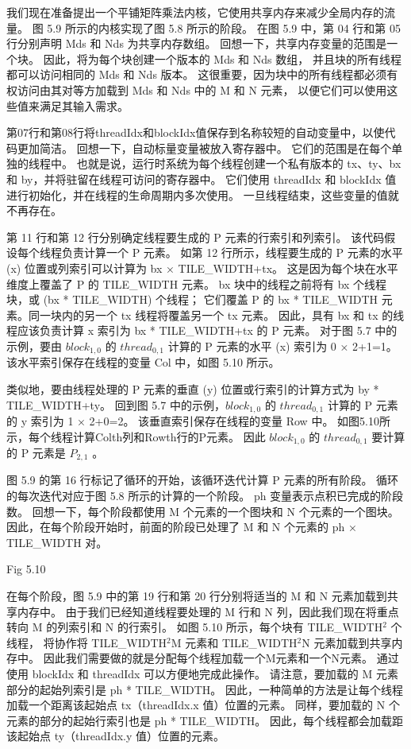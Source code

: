 我们现在准备提出一个平铺矩阵乘法内核，它使用共享内存来减少全局内存的流量。 
图 5.9 所示的内核实现了图 5.8 所示的阶段。 在图 5.9 中，第 04 行和第 05 行分别声明 Mds 和 Nds 为共享内存数组。 
回想一下，共享内存变量的范围是一个块。 因此，将为每个块创建一个版本的 Mds 和 Nds 数组，
并且块的所有线程都可以访问相同的 Mds 和 Nds 版本。 
这很重要，因为块中的所有线程都必须有权访问由其对等方加载到 Mds 和 Nds 中的 M 和 N 元素，
以便它们可以使用这些值来满足其输入需求。

第07行和第08行将threadIdx和blockIdx值保存到名称较短的自动变量中，以使代码更加简洁。 
回想一下，自动标量变量被放入寄存器中。 它们的范围是在每个单独的线程中。 
也就是说，运行时系统为每个线程创建一个私有版本的 tx、ty、bx 和 by，并将驻留在线程可访问的寄存器中。 
它们使用 threadIdx 和 blockIdx 值进行初始化，并在线程的生命周期内多次使用。 一旦线程结束，这些变量的值就不再存在。

第 11 行和第 12 行分别确定线程要生成的 P 元素的行索引和列索引。 该代码假设每个线程负责计算一个 P 元素。 
如第 12 行所示，线程要生成的 P 元素的水平 (x) 位置或列索引可以计算为 bx × TILE\_WIDTH+tx。 
这是因为每个块在水平维度上覆盖了 P 的 TILE\_WIDTH 元素。 
bx 块中的线程之前将有 bx 个线程块，或 (bx * TILE\_WIDTH) 个线程； 
它们覆盖 P 的 bx * TILE\_WIDTH 元素。同一块内的另一个 tx 线程将覆盖另一个 tx 元素。 
因此，具有 bx 和 tx 的线程应该负责计算 x 索引为 bx * TILE\_WIDTH+tx 的 P 元素。 
对于图 5.7 中的示例，要由 $block_{1,0}$ 的 $thread_{0,1}$ 计算的 P 元素的水平 (x) 索引为 0 × 2+1=1。 
该水平索引保存在线程的变量 Col 中，如图 5.10 所示。

类似地，要由线程处理的 P 元素的垂直 (y) 位置或行索引的计算方式为 by * TILE\_WIDTH+ty。 
回到图 5.7 中的示例，$block_{1,0}$ 的 $thread_{0,1}$ 计算的 P 元素的 y 索引为 1 × 2+0=2。 
该垂直索引保存在线程的变量 Row 中。  如图5.10所示，每个线程计算Colth列和Rowth行的P元素。 
因此 $block_{1,0}$ 的 $thread_{0,1}$ 要计算的 P 元素是 $P_{2,1}$ 。

图 5.9 的第 16 行标记了循环的开始，该循环迭代计算 P 元素的所有阶段。 
循环的每次迭代对应于图 5.8 所示的计算的一个阶段。 ph 变量表示点积已完成的阶段数。 
回想一下，每个阶段都使用 M 个元素的一个图块和 N 个元素的一个图块。 
因此，在每个阶段开始时，前面的阶段已处理了 M 和 N 个元素的 ph × TILE\_WIDTH 对。

{\color{red} Fig 5.10}

在每个阶段，图 5.9 中的第 19 行和第 20 行分别将适当的 M 和 N 元素加载到共享内存中。 
由于我们已经知道线程要处理的 M 行和 N 列，因此我们现在将重点转向 M 的列索引和 N 的行索引。
如图 5.10 所示，每个块有 TILE\_WIDTH$^2$ 个线程， 
将协作将 TILE\_WIDTH$^2$M 元素和 TILE\_WIDTH$^2$N 元素加载到共享内存中。 
因此我们需要做的就是分配每个线程加载一个M元素和一个N元素。 通过使用 blockIdx 和 threadIdx 可以方便地完成此操作。 
请注意，要加载的 M 元素部分的起始列索引是 ph * TILE\_WIDTH。 
因此，一种简单的方法是让每个线程加载一个距离该起始点 tx（threadIdx.x 值）位置的元素。 
同样，要加载的 N 个元素的部分的起始行索引也是 ph * TILE\_WIDTH。 
因此，每个线程都会加载距该起始点 ty（threadIdx.y 值）位置的元素。

